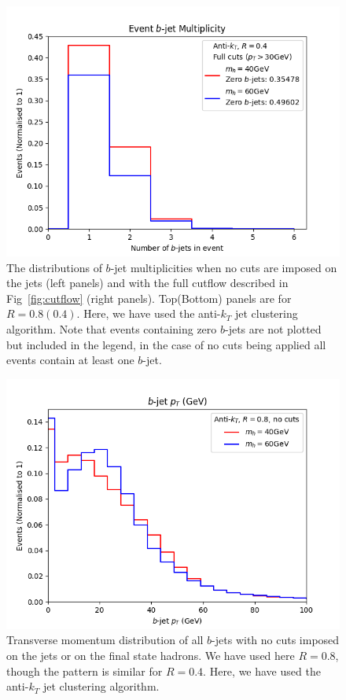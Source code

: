 \documentclass[12pt]{article}
\begin{document}
\begin{figure}[t!]
	\includegraphics[scale=0.5]{plots/nbjets_AK4_pt30.png}
	\caption{The distributions of $b$-jet multiplicities when no cuts are imposed on the jets (left panels) and with the full cutflow described  in
Fig~\ref{fig:cutflow} (right panels). Top(Bottom) panels are for $R = 0.8(0.4)$. Here, we have used the anti-$k_T$ jet clustering algorithm. Note that events containing zero $b$-jets are not plotted but included in the legend, in the case of no cuts being applied all events contain at least one $b$-jet.}
\label{fig:nbjets}
\end{figure}
%
\begin{figure}[htb!]
	\centering
	\includegraphics[scale=0.6]{plots/bjetpt_AK8_nocuts.png}
	\caption{Transverse momentum distribution of all $b$-jets with no cuts imposed on the jets or on the final state hadrons. We have used here $R=0.8$, though the pattern is similar for $R=0.4$. Here, we have used the anti-$k_T$ jet clustering algorithm.}
\label{fig:bjetpt}
\end{figure}
\end{document}
